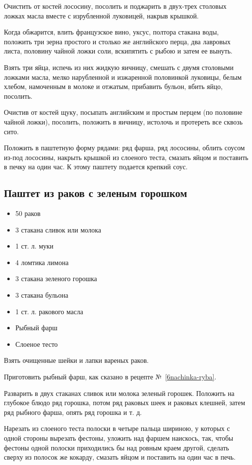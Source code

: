 Очистить от костей лососину, посолить и поджарить в двух-трех столовых ложках масла вместе с изрубленной луковицей, накрыв крышкой.

Когда обжарится, влить французское вино, уксус, полтора стакана воды, положить три зерна простого и столько же английского перца, два лавровых листа, половину чайной ложки соли, вскипятить с рыбою и затем ее вынуть.

Взять три яйца, испечь из них жидкую яичницу, смешать с двумя столовыми ложками масла, мелко нарубленной и изжаренной половинкой луковицы, белым хлебом, намоченным в молоке и отжатым, прибавить бульон, вбить яйцо, посолить.

Очистив от костей щуку, посыпать английским и простым перцем (по половине чайной ложки), посолить, положить в яичницу, истолочь и протереть все сквозь сито.

Положить в паштетную форму рядами: ряд фарша, ряд лососины, облить соусом из-под лососины, накрыть крышкой из слоеного теста, смазать яйцом и поставить в печку на один час. К этому паштету подается крепкий соус.

\subsection{Паштет из раков с зеленым горошком}

\begin{itemize}
	\item 50 раков
    \item 3 стакана сливок или молока
    \item 1 ст. л. муки 
    \item 4 ломтика лимона 
    \item 3 стакана зеленого горошка 
    \item 3 стакана бульона 
    \item 1 ст. л. ракового масла
    \item Рыбный фарш
    \item Слоеное тесто 
\end{itemize}

Взять очищенные шейки и лапки вареных раков.

Приготовить рыбный фарш, как сказано в рецепте №~\ref{6nachinka-ryba}.

Разварить в двух стаканах сливок или молока зеленый горошек. Положить на глубокое блюдо ряд горошка, потом ряд раковых шеек и раковых клешней, затем ряд рыбного фарша, опять ряд горошка и т. д.

Нарезать из слоеного теста полоски в четыре пальца шириною, у которых с одной стороны вырезать фестоны, уложить над фаршем наискось, так, чтобы фестоны одной полоски приходились бы над ровным краем другой, сделать сверху из полосок же кокарду, смазать яйцом и поставить на один час в печь.


